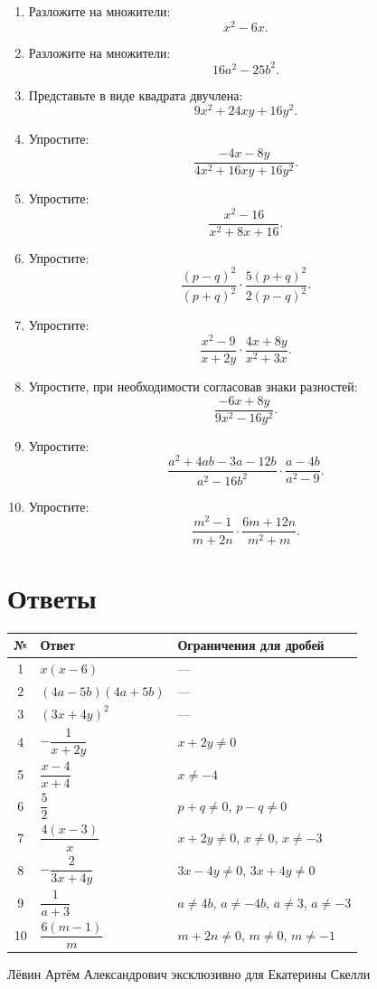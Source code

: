 \documentclass[a4paper,12pt]{article}
\begin{document}
\begin{enumerate}
  \item Разложите на множители:
  \[
  x^2-6x.
  \]

  \item Разложите на множители:
  \[
  16a^2-25b^2.
  \]

  \item Представьте в виде квадрата двучлена:
  \[
  9x^2+24xy+16y^2.
  \]

  \item Упростите:
  \[
  \frac{-4x-8y}{4x^2+16xy+16y^2}.
  \]

  \item Упростите:
  \[
  \frac{x^2-16}{x^2+8x+16}.
  \]

  \item Упростите:
  \[
  \frac{(p-q)^2}{(p+q)^2}\cdot
  \frac{5(p+q)^2}{2(p-q)^2}.
  \]

  \item Упростите:
  \[
  \frac{x^2-9}{x+2y}\cdot
  \frac{4x+8y}{x^2+3x}.
  \]

  \item Упростите, при необходимости согласовав знаки разностей:
  \[
  \frac{-6x+8y}{9x^2-16y^2}.
  \]

  \item Упростите:
  \[
  \frac{a^2+4ab-3a-12b}{a^2-16b^2}\cdot
  \frac{a-4b}{a^2-9}.
  \]

  \item Упростите:
  \[
  \frac{m^2-1}{m+2n}\cdot
  \frac{6m+12n}{m^2+m}.
  \]
\end{enumerate}

\clearpage
\section*{Ответы}
\renewcommand{\arraystretch}{1.35}
\begin{center}
\begin{tabularx}{\linewidth}{@{}c>{\raggedright\arraybackslash}X>{\raggedright\arraybackslash}X@{}}
\toprule
\textbf{№} & \textbf{Ответ} & \textbf{Ограничения для дробей}\\
\midrule
1 & $x(x-6)$ & ---\\
2 & $(4a-5b)(4a+5b)$ & ---\\
3 & $(3x+4y)^2$ & ---\\
4 & $-\dfrac{1}{x+2y}$ & $x+2y\ne0$\\
5 & $\dfrac{x-4}{x+4}$ & $x\ne-4$\\
6 & $\dfrac52$ & $p+q\ne0$, $p-q\ne0$\\
7 & $\dfrac{4(x-3)}{x}$ & $x+2y\ne0$, $x\ne0$, $x\ne-3$\\
8 & $-\dfrac{2}{3x+4y}$ & $3x-4y\ne0$, $3x+4y\ne0$\\
9 & $\dfrac{1}{a+3}$ & $a\ne4b$, $a\ne-4b$, $a\ne3$, $a\ne-3$\\
10 & $\dfrac{6(m-1)}{m}$ & $m+2n\ne0$, $m\ne0$, $m\ne-1$\\
\bottomrule
\end{tabularx}
\end{center}

\vfill
\begin{center}
{\small\color{textgray}Лёвин Артём Александрович эксклюзивно для Екатерины Скелли}
\end{center}
\end{document}
